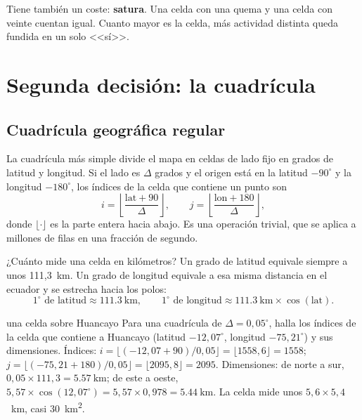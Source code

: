 Tiene también un coste: \textbf{satura}. Una celda con una quema y una celda con veinte cuentan
igual. Cuanto mayor es la celda, más actividad distinta queda fundida en un solo <<sí>>.

\section{Segunda decisión: la cuadrícula}

\subsection{Cuadrícula geográfica regular}

La cuadrícula más simple divide el mapa en celdas de lado fijo en grados de latitud y longitud.
Si el lado es $\Delta$ grados y el origen está en la latitud $-90^\circ$ y la longitud
$-180^\circ$, los índices de la celda que contiene un punto son
\begin{equation}\label{eq:indice}
  i = \left\lfloor \frac{\text{lat} + 90}{\Delta} \right\rfloor,
  \qquad
  j = \left\lfloor \frac{\text{lon} + 180}{\Delta} \right\rfloor,
\end{equation}
donde $\lfloor\cdot\rfloor$ es la parte entera hacia abajo. Es una operación trivial, que se
aplica a millones de filas en una fracción de segundo.

¿Cuánto mide una celda en kilómetros? Un grado de latitud equivale siempre a unos 111,3~km. Un
grado de longitud equivale a esa misma distancia en el ecuador y se estrecha hacia los polos:
\begin{equation}\label{eq:grado}
  1^\circ\text{ de latitud} \approx \SI{111.3}{\kilo\metre},
  \qquad
  1^\circ\text{ de longitud} \approx \SI{111.3}{\kilo\metre}\times\cos(\text{lat}) .
\end{equation}

\begin{ejemplo}{una celda sobre Huancayo}
Para una cuadrícula de $\Delta = 0{,}05^\circ$, halla los índices de la celda que contiene a
Huancayo (latitud $-12{,}07^\circ$, longitud $-75{,}21^\circ$) y sus dimensiones.
\solucion Índices: $i = \lfloor (-12{,}07 + 90)/0{,}05 \rfloor = \lfloor 1558{,}6 \rfloor =
1558$; $j = \lfloor (-75{,}21 + 180)/0{,}05 \rfloor = \lfloor 2095{,}8 \rfloor = 2095$.
Dimensiones: de norte a sur, $0{,}05 \times 111{,}3 = \SI{5.57}{\kilo\metre}$; de este a oeste,
$5{,}57 \times \cos(12{,}07^\circ) = 5{,}57 \times 0{,}978 = \SI{5.44}{\kilo\metre}$. La celda
mide unos $5{,}6 \times 5{,}4$~km, casi \SI{30}{\kilo\metre\squared}.
\end{ejemplo}

